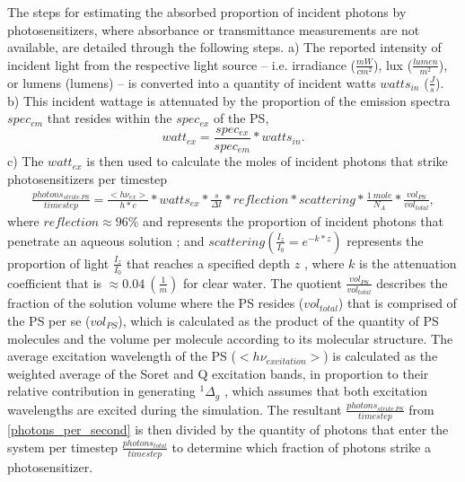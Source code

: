 The steps for estimating the absorbed proportion of incident photons by photosensitizers, where absorbance or transmittance measurements are not available, are detailed through the following steps. a) The reported intensity of incident light from the respective light source -- i.e. irradiance ($\frac{mW}{cm^2}$), lux ($\frac{lumen}{m^2}$), or lumens (lumens) -- is converted into a quantity of incident watts $watts_{in}$ ($\frac{J}{s}$). b) This incident wattage is attenuated by the proportion of the emission spectra $spec_{em}$ that resides within the $spec_{ex}$ of the PS, 
\begin{equation}
    watt_{ex} = \frac{spec_{ex}}{spec_{em}}*watts_{in}.
\end{equation}
c) The $watt_{ex}$ is then used to calculate the moles of incident photons that strike photosensitizers per timestep 
\begin{multline} \label{photons_per_second}
    \frac{photons_{strike~PS}}{timestep}=\frac{<h\nu_{ex}>}{h*c}*watts_{ex} *\frac{s}{\Delta t}*reflection*scattering*\frac{1~mole}{N_A}*\frac{vol_{PS}}{vol_{total}},
\end{multline}
where $reflection \approx 96 \%$ and represents the proportion of incident photons that penetrate an aqueous solution \cite{Gross1993SingletLiposomes}; and $scattering \left(\frac{I_z}{I_0} = e^{-k*z}\right)$ represents the proportion of light $\frac{I_z}{I_0}$ that reaches a specified depth $z$ \cite{RobertW.1973TheSea}, where $k$ is the attenuation coefficient that is $\approx 0.04~(\frac{1}{m})$ \cite{Lorenzen1972ExtinctionPhytoplankton} for clear water. The quotient $\frac{vol_{PS}}{vol_{total}}$ describes the fraction of the solution volume where the PS resides ($vol_{total}$) that is comprised of the PS per se ($vol_{PS}$), which is calculated as the product of the quantity of PS molecules and the volume per molecule according to its molecular structure. The average excitation wavelength of the PS ($<h\nu_{excitation}>$) is calculated as the weighted average of the Soret and Q excitation bands, in proportion to their relative contribution in generating $^1\Delta_g$ \cite{Nitzan2001PhotoinactivationWavelengths,Hoenes2020PhotoinactivationWavelength}, which assumes that both excitation wavelengths are excited during the simulation. The resultant $\frac{photons_{strike~PS}}{timestep}$ from \cref{photons_per_second} is then divided by the quantity of photons that enter the system per timestep $\frac{photons_{total}}{timestep}$ to determine which fraction of photons strike a photosensitizer. 

